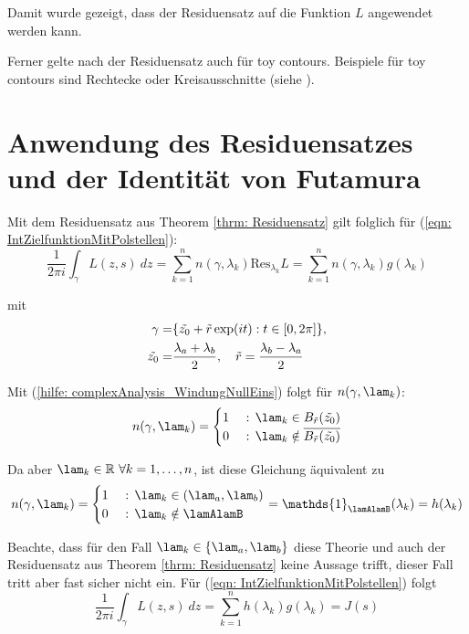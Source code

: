 \documentclass[a4paper,12pt]{report}
\newcommand{\R}{\mathbb R}
\newcommand{\zitat}[1]{\glqq #1\grqq}
\newcommand{\1}{\mathds{1}}
\newcommand{\Res}{\text{Res}}
\theoremstyle{plain} %
\theoremstyle{definition} %
\theoremstyle{remark}
\begin{document}
            Damit wurde gezeigt, dass der Residuensatz auf die Funktion $L$ angewendet werden kann.

            Ferner gelte nach \cite[S. 77]{complexAnalysisVL} der Residuensatz auch für \zitat{toy contours}\cite[S. 77]{complexAnalysisVL}.
            Beispiele für toy contours sind Rechtecke oder Kreisausschnitte (siehe \cite[S. 42]{complexAnalysisVL}).

      \section{Anwendung des Residuensatzes und der Identität von Futamura}
            Mit dem Residuensatz aus Theorem \ref{thrm: Residuensatz} gilt folglich für (\ref{eqn: IntZielfunktionMitPolstellen}):
            $$\frac 1 {2\pi i}\int_\gamma L(z,s)\ dz = \sum_{k=1}^{n} n(\gamma, \lambda_k) \Res_{\lambda_k}L = \sum_{k=1}^{n} n(\gamma, \lambda_k) g(\lambda_k)$$

            mit \begin{align}
                  \gamma =& \{\Tilde{z_0} + \Tilde r\exp(i t): t\in [0,2\pi]\},\label{def: gamma}\\
                  \Tilde{z_0} =& \frac {\lambda_a+\lambda_b} {2},\quad\Tilde r = \frac {\lambda_b-\lambda_a} {2}\nonumber
            \end{align}

            Mit (\ref{hilfe: complexAnalysis_WindungNullEins}) folgt für $n(\gamma, \lam_k)$:
            $$n(\gamma, \lam_k) = \begin{cases}
                  1& \text{ : }\lam_k\in B_{\Tilde{r}}(\Tilde{z_0})\\
                  0& \text{ : }\lam_k\notin\overline {B_{\Tilde{r}}(\Tilde{z_0})}
            \end{cases}$$
            
            Da aber $\lam_k\in \R\ \forall k=1,\dots,n$, ist diese Gleichung äquivalent zu
            $$n(\gamma, \lam_k) = \begin{cases}
                  1& \text{ : }\lam_k\in (\lam_a,\lam_b)\\
                  0& \text{ : }\lam_k\notin \lamAlamB
            \end{cases} = \1_{\lamAlamB}(\lambda_k) = h(\lambda_k)$$

            Beachte, dass für den Fall $\lam_k \in \{\lam_a, \lam_b\}$ diese Theorie und auch der Residuensatz aus Theorem \ref{thrm: Residuensatz} keine Aussage trifft, dieser Fall tritt aber fast sicher nicht ein.
            Für (\ref{eqn: IntZielfunktionMitPolstellen}) folgt
            $$\frac 1 {2\pi i}\int_\gamma L(z,s)\ dz = \sum_{k=1}^{n} h(\lambda_k) g(\lambda_k) = J(s)$$
            
\end{document}
